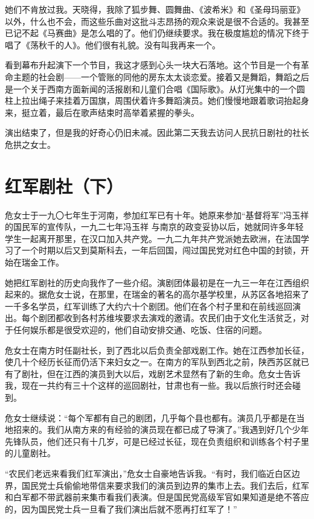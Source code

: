 \documentclass[10pt]{book}
\begin{document}
她们不肯放过我。天晓得，我除了狐步舞、圆舞曲、《波希米》和《圣母玛丽亚》以外，什么也不会，而这些乐曲对这批斗志昂扬的观众来说是很不合适的。我甚至已记不起《马赛曲》是怎么唱的了。他们仍继续要求。我在极度尴尬的情况下终于唱了《荡秋千的人》。他们很有礼貌。没有叫我再来一个。

看到幕布升起演下一个节目，我这才感到心头一块大石落地。这个节目是一个有革命主题的社会剧——一个管账的同他的房东太太谈恋爱。接着又是舞蹈，舞蹈之后是一个关于西南方面新闻的活报剧和儿童们合唱《国际歌》。从灯光集中的一个圆柱上拉出绳子来挂着万国旗，周围伏着许多舞蹈演员。她们慢慢地跟着歌词抬起身来，挺立着，最后在歌声结束时高举着紧握的拳头。

演出结束了，但是我的好奇心仍旧未减。因此第二天我去访问人民抗日剧社的社长危拱之女士。

\section{红军剧社（下）}

危女士于一九〇七年生于河南，参加红军已有十年。她原来参加“基督将军”冯玉祥的国民军的宣传队，一九二七年冯玉祥 与南京的政变妥协以后，她就同许多年轻学生一起离开那里，在汉口加入共产党。一九二九年共产党派她去欧洲，在法国学习了一个时期以后又到莫斯科去，一年后回国，闯过国民党对红色中国的封锁，开始在瑞金工作。

她把红军剧社的历史向我作了一些介绍。演剧团体最初是在一九三一年在江西组织起来的。据危女士说，在那里，在瑞金的著名的高尔基学校里，从苏区各地招来了一千多名学员，红军训练了大约六十个剧团。他们在各个村子里和在前线巡回演出。每个剧团都收到各村苏维埃要求去演戏的邀请。农民们由于文化生活贫乏，对于任何娱乐都是很受欢迎的，他们自动安排交通、吃饭、住宿的问题。

危女士在南方时任副社长，到了西北以后负责全部戏剧工作。她在江西参加长征，使几十个经历长征而仍活下来妇女之一。在南方的军队到西北之前，陕西苏区就已有了剧社，但在江西的演员到大以后，戏剧艺术显然有了新的生命。危女士告诉我，现在一共约有三十个这样的巡回剧社，甘肃也有一些。我以后旅行时还会碰到。

危女士继续说：“每个军都有自己的剧团，几乎每个县也都有。演员几乎都是在当地招来的。我们从南方来的有经验的演员现在都已成了导演了。”我遇到好几个少年先锋队员，他们还只有十几岁，可是已经过长征，现在负责组织和训练各个村子里的儿童剧社。

“农民们老远来看我们红军演出，”危女士自豪地告诉我。“有时，我们临近白区边界，国民党士兵偷偷地带信来要求我们的演员到边界的集市上去。我们去后，红军和白军都不带武器前来集市看我们表演。但是国民党高级军官如果知道是绝不答应的，因为国民党士兵一旦看了我们演出后就不愿再打红军了！”
\end{document}
